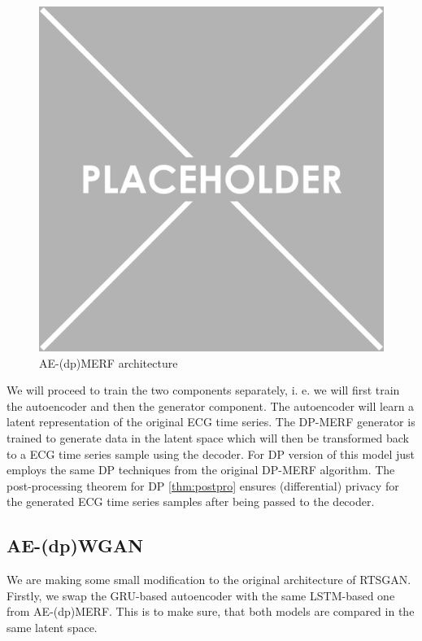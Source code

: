 \begin{figure}[h]
    \centering
    \includegraphics[scale=0.5]{../images/placeholder.png}
    \caption[]{AE-(dp)MERF architecture}
\end{figure}

We will proceed to train the two components separately, i. e. we will first train the autoencoder and then the generator component. The autoencoder will learn a latent representation of the original ECG time series. The DP-MERF generator is trained to generate data in the latent space which will then be transformed back to a ECG time series sample using the decoder. For DP version of this model just employs the same DP techniques from the original DP-MERF algorithm. The post-processing theorem for DP \ref{thm:postpro} ensures (differential) privacy for the generated ECG time series samples after being passed to the decoder.

\subsection{AE-(dp)WGAN}
We are making some small modification to the original architecture of RTSGAN. Firstly, we swap the GRU-based autoencoder with the same LSTM-based one from AE-(dp)MERF. This is to make sure, that both models are compared in the same latent space.


